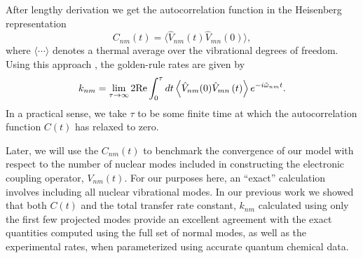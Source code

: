 After lengthy derivation we get the autocorrelation function in the Heisenberg representation
$$
C_{nm}(t) =\langle \hat V_{nm}(t) \hat V_{mn}(0)\rangle,\label{cor-fun}
$$
where $\langle \cdots \rangle$ denotes a thermal average over the
vibrational degrees of freedom.
Using this approach , the golden-rule rates are given by
\begin{eqnarray}
k_{nm}=\lim_{\tau \to \infty}2{\rm Re}\int_{0}^{\tau}dt\left\langle \hat V_{nm}(0)\hat V_{mn}\left(t\right)\right\rangle e^{-i\tilde\omega_{nm}t}.
\end{eqnarray}
In a practical sense, we take $\tau$ to be some finite time at which the
autocorrelation function $C(t)$
has relaxed to zero.

Later, we will use the $C_{nm}(t) $ to benchmark the convergence of our model with respect to
the number of nuclear modes included in constructing the electronic coupling operator, $V_{nm}(t)$.
For our purposes here,  an ``exact''  calculation involves including all nuclear vibrational modes.
In our previous work we showed that both $C(t)$
and the total transfer rate constant, $k_{nm}$ calculated using only the first few projected modes provide an
excellent agreement with the exact quantities computed using  the full set of
normal modes, as well as the experimental rates,
when parameterized using accurate quantum chemical data.\cite{yang2014intramolecular}






